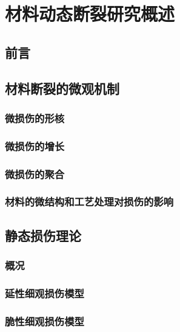 \documentclass[degree=postdoc]{sysuthesis}
\begin{document}
\OMIT


\mainmatter

\clearpage
\setcounter{page}{1}
\chapter{材料动态断裂研究概述}

\clearpage
\setcounter{page}{3}
\section{前言}

\clearpage
\setcounter{page}{7}
\section{材料断裂的微观机制}
\subsection{微损伤的形核}

\clearpage
\setcounter{page}{12}
\subsection{微损伤的增长}

\clearpage
\setcounter{page}{13}
\subsection{微损伤的聚合}

\clearpage
\setcounter{page}{14}
\subsection{材料的微结构和工艺处理对损伤的影响}
\section{静态损伤理论}
\subsection{概况}

\clearpage
\setcounter{page}{17}
\subsection{延性细观损伤模型}

\clearpage
\setcounter{page}{20}
\subsection{脆性细观损伤模型}
\end{document}
